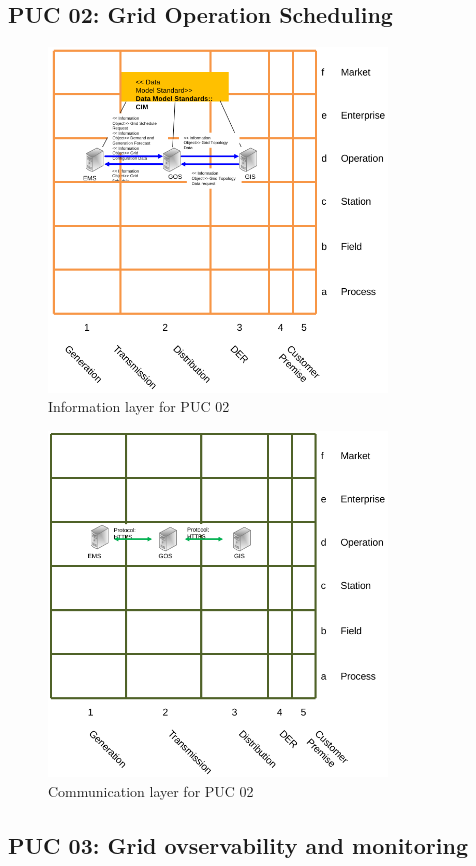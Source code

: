 \subsection*{PUC 02: Grid Operation Scheduling}


\begin{figure}[!htb]\centering
  \includegraphics[width=9.0cm]{Data/i2.png}
\caption{Information layer for PUC 02}
\label{fig:i2}
\end{figure}


\begin{figure}[!htb]\centering
  \includegraphics[width=9.0cm]{Data/c2.png}
\caption{Communication layer for PUC 02}
\label{fig:c2}
\end{figure}



\clearpage
\newpage
\subsection*{PUC 03: Grid ovservability and monitoring}



